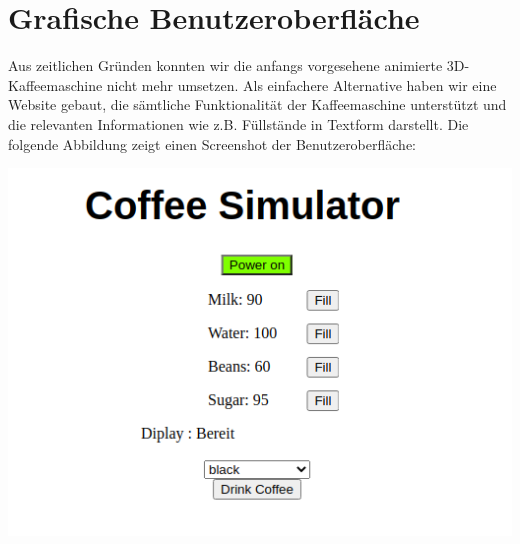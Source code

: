 \chapter{Grafische Benutzeroberfläche}\label{ch:gui}
Aus zeitlichen Gründen konnten wir die anfangs vorgesehene animierte 3D-Kaffeemaschine nicht mehr umsetzen.
Als einfachere Alternative haben wir eine Website gebaut, die sämtliche Funktionalität der Kaffeemaschine unterstützt und die relevanten Informationen wie z.B. Füllstände in Textform darstellt.
Die folgende Abbildung zeigt einen Screenshot der Benutzeroberfläche:

\begin{center}
    \includegraphics[width=1\textwidth]{resources/frontend}
\end{center}
